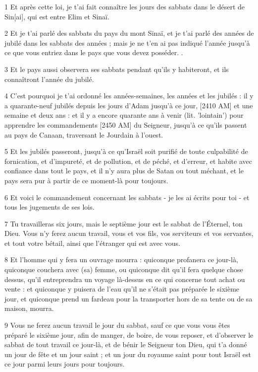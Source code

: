 \par 1 Et après cette loi, je t'ai fait connaître les jours des sabbats dans le désert de Sin[ai], qui est entre Elim et Sinaï.
\par 2 Et je t'ai parlé des sabbats du pays du mont Sinaï, et je t'ai parlé des années de jubilé dans les sabbats des années ; mais je ne t'en ai pas indiqué l'année jusqu'à ce que vous entriez dans le pays que vous devez posséder. .
\par 3 Et le pays aussi observera ses sabbats pendant qu'ils y habiteront, et ils connaîtront l'année du jubilé.
\par 4 C'est pourquoi je t'ai ordonné les années-semaines, les années et les jubilés : il y a quarante-neuf jubilés depuis les jours d'Adam jusqu'à ce jour, [2410 AM] et une semaine et deux ans : et il y a encore quarante ans à venir (lit. 'lointain') pour apprendre les commandements [2450 AM] du Seigneur, jusqu'à ce qu'ils passent au pays de Canaan, traversant le Jourdain à l'ouest.
\par 5 Et les jubilés passeront, jusqu'à ce qu'Israël soit purifié de toute culpabilité de fornication, et d'impureté, et de pollution, et de péché, et d'erreur, et habite avec confiance dans tout le pays, et il n'y aura plus de Satan ou tout méchant, et le pays sera pur à partir de ce moment-là pour toujours.
\par 6 Et voici le commandement concernant les sabbats - je les ai écrits pour toi - et tous les jugements de ses lois.
\par 7 Tu travailleras six jours, mais le septième jour est le sabbat de l'Éternel, ton Dieu. Vous n'y ferez aucun travail, vous et vos fils, vos serviteurs et vos servantes, et tout votre bétail, ainsi que l'étranger qui est avec vous.
\par 8 Et l'homme qui y fera un ouvrage mourra : quiconque profanera ce jour-là, quiconque couchera avec (sa) femme, ou quiconque dit qu'il fera quelque chose dessus, qu'il entreprendra un voyage là-dessus en ce qui concerne tout achat ou vente : et quiconque y puisera de l'eau qu'il ne s'était pas préparée le sixième jour, et quiconque prend un fardeau pour la transporter hors de sa tente ou de sa maison, mourra.
\par 9 Vous ne ferez aucun travail le jour du sabbat, sauf ce que vous vous êtes préparé le sixième jour, afin de manger, de boire, de vous reposer, et d'observer le sabbat de tout travail ce jour-là, et de bénir le Seigneur ton Dieu, qui t'a donné un jour de fête et un jour saint ; et un jour du royaume saint pour tout Israël est ce jour parmi leurs jours pour toujours.
